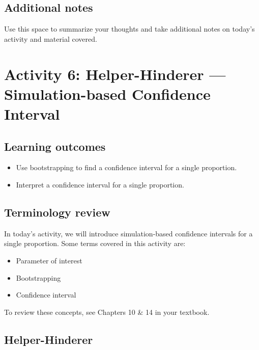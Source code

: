 \documentclass[
]{report}
\begin{document}
\subsection{Additional notes}\label{additional-notes-4}

Use this space to summarize your thoughts and take additional notes on today's activity and material covered.

\newpage

\section{Activity 6: Helper-Hinderer --- Simulation-based Confidence Interval}\label{activity-6-helper-hinderer-simulation-based-confidence-interval}


\subsection{Learning outcomes}\label{learning-outcomes-5}

\begin{itemize}
\item
  Use bootstrapping to find a confidence interval for a single proportion.
\item
  Interpret a confidence interval for a single proportion.
\end{itemize}

\subsection{Terminology review}\label{terminology-review-4}

In today's activity, we will introduce simulation-based confidence intervals for a single proportion. Some terms covered in this activity are:

\begin{itemize}
\item
  Parameter of interest
\item
  Bootstrapping
\item
  Confidence interval
\end{itemize}

To review these concepts, see Chapters 10 \& 14 in your textbook.

\subsection{Helper-Hinderer}\label{helper-hinderer-2}
\end{document}
